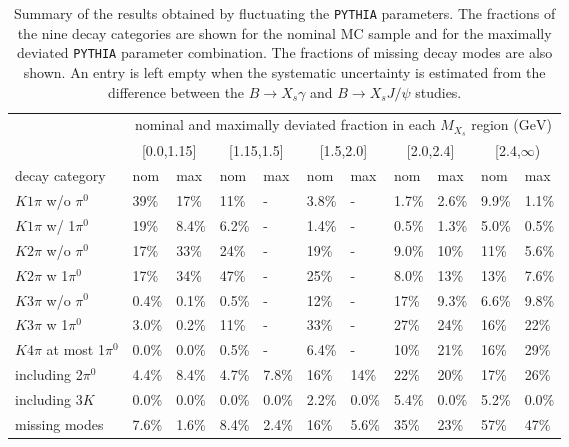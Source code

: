 \begin{table}
\caption{Summary of the results obtained by fluctuating the \texttt{PYTHIA} parameters. The fractions of the nine decay categories are shown for the nominal MC sample and for the maximally deviated \texttt{PYTHIA} parameter combination. The fractions of missing decay modes are also shown. An entry is left empty when the systematic uncertainty is estimated from the difference between the $B \rightarrow X_{s} \gamma$ and $B \rightarrow X_{s} J/\psi$ studies.}
  \renewcommand{\arraystretch}{1.4}
  \centering

\begin{adjustbox}{max width=0.98\textheight}
\begin{tabular}{ p{3.5cm} p{1.2cm} p{1.2cm} p{1.2cm} p{1.2cm} p{1.2cm} p{1.2cm} p{1.2cm} p{1.2cm} p{1.2cm} p{1.2cm}}
 \hline
  \hline
 & \multicolumn{10}{c}{nominal and maximally deviated fraction in each $M_{X_{s}}$ region ($\textrm{GeV}$)} \\\cline{2-11}
 & \multicolumn{2}{c}{[0.0,1.15]} & \multicolumn{2}{c}{[1.15,1.5]} & \multicolumn{2}{c}{[1.5,2.0]} & \multicolumn{2}{c}{[2.0,2.4]} & \multicolumn{2}{c}{[2.4,$\infty$)}\\
decay category &  nom & max & nom & max & nom & max & nom & max & nom & max \\
 \hline
$K1\pi$ w/o $\pi^{0}$ & 39\% & 17\% & 11\% & - & 3.8\% & - & 1.7\% & 2.6\% & 9.9\% & 1.1\% \\
$K1\pi$ w/ 1$\pi^{0}$ & 19\% & 8.4\% & 6.2\% & - & 1.4\% & - & 0.5\% & 1.3\% & 5.0\% & 0.5\% \\
$K2\pi$ w/o $\pi^{0}$ & 17\% & 33\% & 24\% & - & 19\% & - & 9.0\% & 10\% & 11\% & 5.6\% \\
$K2\pi$ w 1$\pi^{0}$ & 17\% & 34\% & 47\% & - & 25\% & - & 8.0\% & 13\% & 13\% & 7.6\% \\
$K3\pi$ w/o $\pi^{0}$ & 0.4\% & 0.1\% & 0.5\% & - & 12\% & - & 17\% & 9.3\% & 6.6\% & 9.8\% \\
$K3\pi$ w 1$\pi^{0}$ & 3.0\% & 0.2\% & 11\% & - & 33\% & - & 27\% & 24\% & 16\% & 22\% \\
$K4\pi$ at most 1$\pi^{0}$ & 0.0\% & 0.0\% & 0.5\% & - & 6.4\% & - & 10\% & 21\% & 16\% & 29\% \\
including 2$\pi^{0}$ & 4.4\% & 8.4\% & 4.7\% & 7.8\% & 16\% & 14\% & 22\% & 20\% & 17\% & 26\% \\
including 3$K$ & 0.0\% & 0.0\% & 0.0\% & 0.0\% & 2.2\% & 0.0\% & 5.4\% & 0.0\% & 5.2\% & 0.0\% \\
\hline
missing modes & 7.6\% & 1.6\% & 8.4\% & 2.4\% & 16\% & 5.6\% & 35\% & 23\% & 57\% & 47\% \\
\hline
\hline
\end{tabular}
\end{adjustbox}
    \label{tab:Pythia_fluctuation_result}
\end{table}

